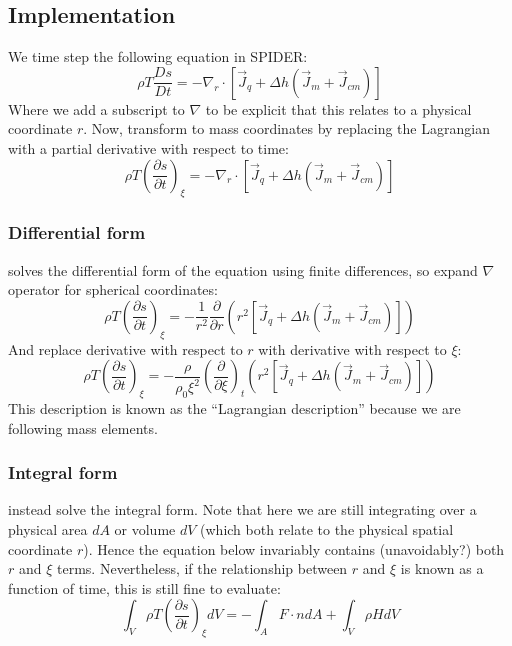 \subsection{Implementation}
We time step the following equation in SPIDER:
\begin{equation}
\rho T \frac{Ds}{Dt} = -\nabla_r \cdot \left[ \vec{J}_q + \Delta h (\vec{J}_m + \vec{J}_{cm}) \right]
\end{equation}
Where we add a subscript to $\nabla$ to be explicit that this relates to a physical coordinate $r$.  Now, transform to mass coordinates by replacing the Lagrangian with a partial derivative with respect to time:
\begin{equation}
\rho T \left( \frac{\partial s}{\partial t} \right)_\xi = -\nabla_r \cdot \left[ \vec{J}_q + \Delta h (\vec{J}_m + \vec{J}_{cm}) \right]
\end{equation}

\subsubsection{Differential form}
\cite{ABE93} solves the differential form of the equation using finite differences, so expand $\nabla$ operator for spherical coordinates:
\begin{equation}
\rho T \left( \frac{\partial s}{\partial t} \right)_\xi = -\frac{1}{r^2} \frac{\partial}{\partial r} \left( r^2 \left[ \vec{J}_q + \Delta h (\vec{J}_m + \vec{J}_{cm}) \right] \right)
\end{equation}
And replace derivative with respect to $r$ with derivative with respect to $\xi$:
\begin{equation}
\rho T \left( \frac{\partial s}{\partial t} \right)_\xi = - \frac{\rho}{\rho_0 \xi^2} \left(\frac{\partial}{\partial \xi} \right)_t \left( r^2 \left[ \vec{J}_q + \Delta h (\vec{J}_m + \vec{J}_{cm}) \right] \right)
\label{eq:finals}
\end{equation}
This description is known as the ``Lagrangian description'' \citep[e.g.,][]{KWW12} because we are following mass elements.
\subsubsection{Integral form}
\cite{BSW18} instead solve the integral form.  Note that here we are still integrating over a physical area $dA$ or volume $dV$ (which both relate to the physical spatial coordinate $r$).  Hence the equation below invariably contains (unavoidably?) both $r$ and $\xi$ terms.  Nevertheless, if the relationship between $r$ and $\xi$ is known as a function of time, this is still fine to evaluate:
\begin{equation}
\int_V \rho T \left( \frac{\partial s}{\partial t} \right)_\xi dV = - \int_A F \cdot n dA + \int_V \rho H dV
\end{equation}
